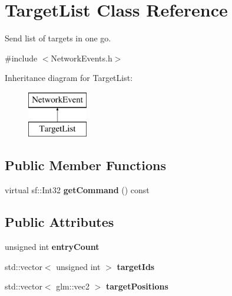 \hypertarget{class_target_list}{\section{Target\-List Class Reference}
\label{class_target_list}
}


Send list of targets in one go.  




{\ttfamily \#include $<$Network\-Events.\-h$>$}

Inheritance diagram for Target\-List\-:\begin{figure}[H]
\begin{center}
\leavevmode
\includegraphics[height=2.000000cm]{class_target_list}
\end{center}
\end{figure}
\subsection*{Public Member Functions}
\begin{DoxyCompactItemize}
\item 
\hypertarget{class_target_list_a645770f4c609ff6cf83ebed701ef6644}{virtual sf\-::\-Int32 {\bfseries get\-Command} () const }\label{class_target_list_a645770f4c609ff6cf83ebed701ef6644}

\end{DoxyCompactItemize}
\subsection*{Public Attributes}
\begin{DoxyCompactItemize}
\item 
\hypertarget{class_target_list_a5ca9ed23341ce1483d5fb77724ca68a1}{unsigned int {\bfseries entry\-Count}}\label{class_target_list_a5ca9ed23341ce1483d5fb77724ca68a1}

\item 
\hypertarget{class_target_list_a7e1571e9657d022ecac52125d631b911}{std\-::vector$<$ unsigned int $>$ {\bfseries target\-Ids}}\label{class_target_list_a7e1571e9657d022ecac52125d631b911}

\item 
\hypertarget{class_target_list_a24fb83f4fa75f5444353f33341300956}{std\-::vector$<$ glm\-::vec2 $>$ {\bfseries target\-Positions}}\label{class_target_list_a24fb83f4fa75f5444353f33341300956}

\end{DoxyCompactItemize}

